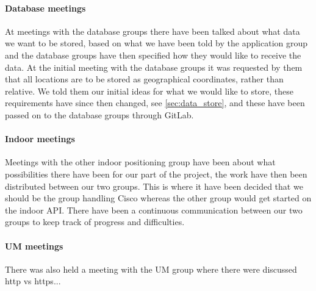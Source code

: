 \paragraph{Database meetings}
At meetings with the database groups there have been talked about what data we want to be stored, based on what we have been told by the application group and the database groups have then specified how they would like to receive the data. At the initial meeting with the database groups it was requested by them that all locations are to be stored as geographical coordinates, rather than relative. We told them our initial ideas for what we would like to store, these requirements have since then changed, see \cref{sec:data_store}, and these have been passed on to the database groups through GitLab.

\paragraph{Indoor meetings}
Meetings with the other indoor positioning group have been about what possibilities there have been for our part of the project, the work have then been distributed between our two groups. This is where it have been decided that we should be the group handling Cisco whereas the other group would get started on the indoor API. There have been a continuous communication between our two groups to keep track of progress and difficulties. 

\paragraph{UM meetings}
There was also held a meeting with the UM group where there were discussed http vs https... 